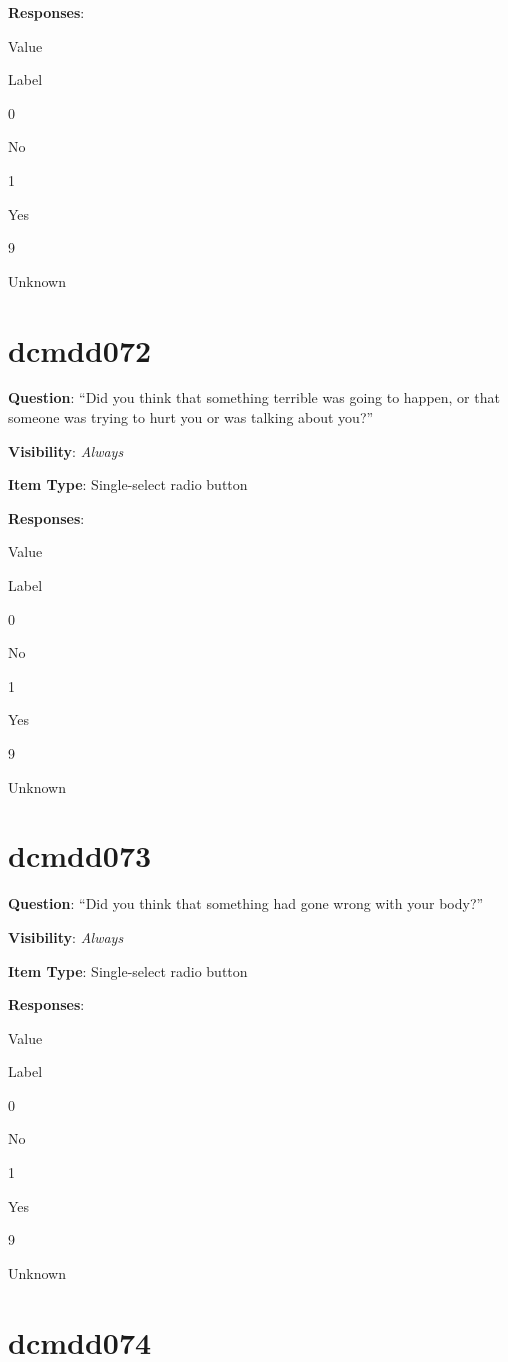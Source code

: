 \documentclass[
]{book}
\begin{document}
\textbf{Responses}:

Value

Label

0

No

1

Yes

9

Unknown

\hypertarget{dcmdd072}{%
\section{dcmdd072}\label{dcmdd072}}

\textbf{Question}: ``Did you think that something terrible was going to happen, or that someone was trying to hurt you or was talking about you?''

\textbf{Visibility}: \emph{Always}

\textbf{Item Type}: Single-select radio button

\textbf{Responses}:

Value

Label

0

No

1

Yes

9

Unknown

\hypertarget{dcmdd073}{%
\section{dcmdd073}\label{dcmdd073}}

\textbf{Question}: ``Did you think that something had gone wrong with your body?''

\textbf{Visibility}: \emph{Always}

\textbf{Item Type}: Single-select radio button

\textbf{Responses}:

Value

Label

0

No

1

Yes

9

Unknown

\hypertarget{dcmdd074}{%
\section{dcmdd074}\label{dcmdd074}}
\end{document}
